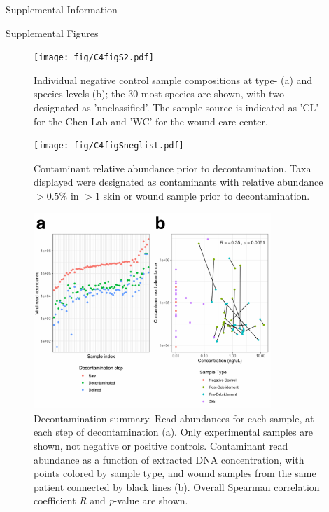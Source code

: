 \documentclass[oneside,12pt,final]{sty/ucthesis-CA2012}
\begin{document}
\begin{mainmatter}
\begin{section}{Supplemental Information}
\begin{subsection}{Supplemental Figures}
\begin{figure}[tp]
\centering
\centerline{\texttt{[image: fig/C4figS2.pdf]}}
\caption{Individual negative control sample compositions at type- (a) and species-levels (b); the 30 most species are shown, with two designated as 'unclassified'. The sample source is indicated as 'CL' for the Chen Lab and 'WC' for the wound care center.}
\label{fig:C4S2}
\end{figure}

\begin{figure}[tp]
\centering
\centerline{\texttt{[image: fig/C4figSneglist.pdf]}}
\caption{Contaminant relative abundance prior to decontamination. Taxa displayed were designated as contaminants with relative abundance $>0.5\%$ in $>1$ skin or wound sample prior to decontamination.}
\label{fig:C4Sneglist}
\end{figure}

\begin{figure}[tp]
\centering
\centerline{\includegraphics[width=0.8\textwidth]{fig/C4figS3.pdf}}
\caption{Decontamination summary. Read abundances for each sample, at each step of decontamination (a). Only experimental samples are shown, not negative or positive controls. Contaminant read abundance as a function of extracted DNA concentration, with points colored by sample type, and wound samples from the same patient connected by black lines (b). Overall Spearman correlation coefficient \textit{R} and \textit{p}-value are shown.}
\label{fig:C4S3}
\end{figure}


\end{subsection}
\end{section}
\end{mainmatter}
\end{document}
